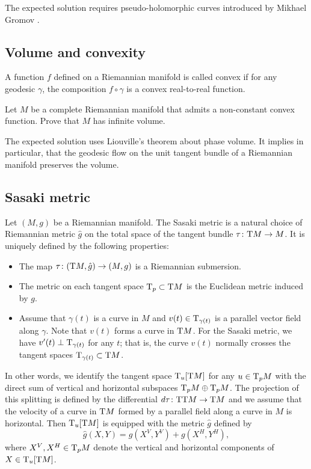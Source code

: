 The expected solution requires pseudo-holomorphic curves introduced by Mikhael Gromov \cite{gromov-pseudoholomorphic}.

\subsection*{Volume and convexity\thm}
\label{Volume and convexity} 

A function $f$ defined on a Riemannian manifold is called convex if for any geodesic $\gamma$, the composition $f\circ\gamma$ is a convex real-to-real function.

\begin{pr}
Let $M$ be a complete Riemannian manifold that admits a non-constant convex function. 
Prove that $M$ has infinite volume.
\end{pr}

The expected solution uses Liouville's theorem about phase volume.
It implies in particular, that the geodesic flow on the unit tangent bundle of a Riemannian manifold preserves the volume.


\subsection*{Sasaki metric}
\label{pr:Sasaki metric}

Let $(M,g)$ be a Riemannian manifold.
The Sasaki metric is a natural choice of Riemannian metric $\hat g$ on the total space of the tangent bundle $\tau\colon\mathrm{T} M\to M$.
It is uniquely defined by the following properties:
\begin{itemize}
\item The map $\tau\colon(\mathrm{T} M,\hat g)\to (M,g)$ is a Riemannian submersion.
\item The metric on each tangent space $\mathrm{T}_p\subset \mathrm{T} M$ is the Euclidean metric induced by $g$.
\item Assume that $\gamma(t)$ is a curve in $M$ and $v(t)\in\mathrm{T}_{\gamma(t)}$ is a parallel vector field along $\gamma$. 
Note that $v(t)$ forms a curve in $\mathrm{T} M$.
For the Sasaki metric, we have $v'(t)\perp \mathrm{T}_{\gamma(t)}$ for any $t$;
that is, the curve $v(t)$ normally crosses the tangent spaces $\mathrm{T}_{\gamma(t)}\subset \mathrm{T} M$.
\end{itemize}

In other words, we identify the tangent space 
$\mathrm{T}_u[\mathrm{T} M]$ for any $u\z\in \T_p M$ with the direct sum of vertical and horizontal subspaces $\T_p M\z\oplus \T_p M$.
The projection of this splitting is defined by the differential $d\tau\colon\mathrm{T}\mathrm{T} M\to \mathrm{T} M$
and we assume that the velocity of a curve in $\mathrm{T} M$ formed by a parallel field along a curve in $M$ is horizontal.
Then $\mathrm{T}_u[\mathrm{T} M]$ is equipped with the metric $\hat g$ defined by
\[\hat g(X,Y)=g(X^V,Y^V)+g(X^H,Y^H),\]
where $X^V,X^H\in\mathrm{T}_pM$ denote the vertical and horizontal components of $X\in\mathrm{T}_u[\mathrm{T} M]$.



